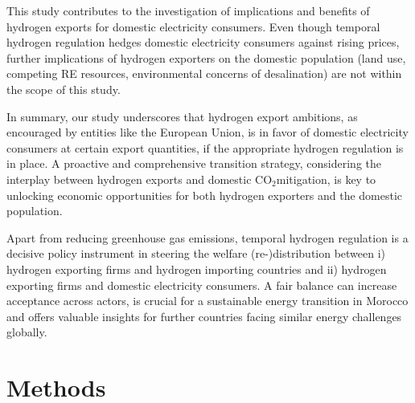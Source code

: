 \documentclass[5p,numafflabel]{elsarticle}
\newcommand{\co}{\ce{CO2}~}
\def\co{CO${}_2${\:}}
\begin{document}
This study contributes to the investigation of implications and benefits of hydrogen exports for domestic electricity consumers. Even though temporal hydrogen regulation hedges domestic electricity consumers against rising prices, further implications of hydrogen exporters on the domestic population (land use, competing RE resources, environmental concerns of desalination) are not within the scope of this study.

In summary, our study underscores that hydrogen export ambitions, as encouraged by entities like the European Union, is in favor of domestic electricity consumers at certain export quantities, if the appropriate hydrogen regulation is in place. A proactive and comprehensive transition strategy, considering the interplay between hydrogen exports and domestic \co mitigation, is key to unlocking economic opportunities for both hydrogen exporters and the domestic population. 


Apart from reducing greenhouse gas emissions, temporal hydrogen regulation is a decisive policy instrument in steering the welfare (re-)distribution between i) hydrogen exporting firms and hydrogen importing countries and ii) hydrogen exporting firms and domestic electricity consumers. 
A fair balance can increase acceptance across actors, is crucial for a sustainable energy transition in Morocco and offers valuable insights for further countries facing similar energy challenges globally.


\section*{Methods}
\label{sec:methods}
\end{document}
